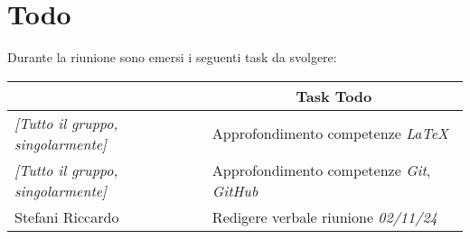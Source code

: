 \section{Todo}

Durante la riunione sono emersi i seguenti task da svolgere:

\vspace{0.5cm}

\begin{table}[htbp]
\begin{tabular}{|p{}|p{}|}
    \hline
    \rowcolor[gray]{0.9}
    \multicolumn{1}{|c|}{\textbf{Assegnatario}} & \multicolumn{1}{|c|}{\textbf{Task Todo}} \\
    \hline
    \emph{[Tutto il gruppo, singolarmente]} & Approfondimento competenze \emph{LaTeX} \\
    \hline
    \emph{[Tutto il gruppo, singolarmente]} & Approfondimento competenze \emph{Git}, \emph{GitHub} \\
    \hline
    Stefani Riccardo & Redigere verbale riunione \emph{02/11/24} \\
    \hline
\end{tabular}
\end{table}
